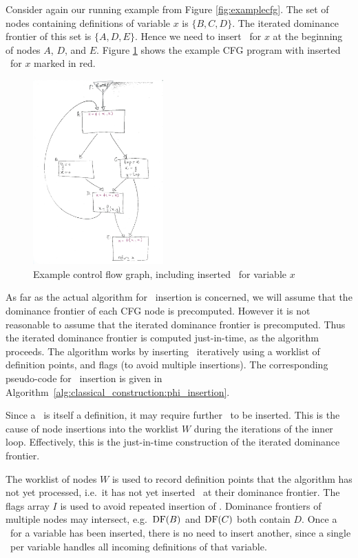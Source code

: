 Consider again our running example from Figure 
\ref{fig:examplecfg}. The set of nodes containing definitions
of variable
$x$ is $\{ B,C,D \}$. The iterated dominance frontier of this set
is $\{ A, D, E \}$. Hence we need to insert 
\phiops\ for $x$ at the beginning of nodes $A$, $D$, and $E$.
Figure \ref{fig:examplecfg_varx} shows the example CFG program
with inserted \phiops\ for $x$ marked in red.

\begin{figure}
\includegraphics[width=5cm]{ssa_variablex.jpg}
\caption{\label{fig:examplecfg_varx}Example control flow graph, including
inserted \phiops\ for variable $x$
}
\end{figure}



As far as the actual algorithm for \phiops\ insertion
is concerned, we will assume that the dominance
frontier of each CFG node is precomputed. However
it is not reasonable to assume that the iterated dominance frontier is
precomputed.
Thus the iterated dominance frontier is computed just-in-time,
as the algorithm proceeds.
The algorithm works by inserting \phiops\ iteratively
using a worklist of definition points, and flags (to avoid multiple
insertions). The corresponding pseudo-code for
\phiop\ insertion is given in
Algorithm~\ref{alg:classical_construction:phi_insertion}.

Since a \phiop\ is itself a 
definition, it may require further \phiops\ to be inserted.
This is the cause of node insertions into the  worklist $W$ during
the iterations of the inner loop.
Effectively, this is the just-in-time construction of
the iterated dominance frontier.

The worklist of nodes $W$ is used to record definition points that the
algorithm
has not yet processed, i.e.\ it has not yet inserted \phiops\ at their dominance
frontier.
The flags array $I$ is used to avoid repeated insertion of \phiops. Dominance
frontiers
of multiple nodes may intersect, e.g.\ $\mathrm{DF}(B)$ and $\mathrm{DF}(C)$ both contain $D$. 
Once a \phiop\ for a variable has been
inserted, there is no need to insert another, since a single \phiop\ per
variable handles all incoming definitions of that variable.

